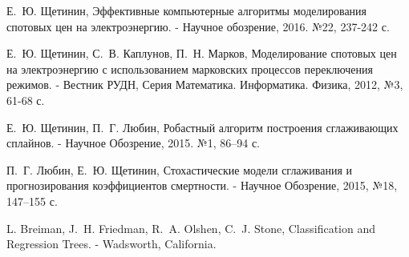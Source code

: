 \documentclass[60x84/16,8pt]{ittmm}
\begin{document}
\begin{thebibliography}{99}

Е.~Ю. Щетинин, Эффективные компьютерные алгоритмы моделирования спотовых цен на
электроэнергию. - Научное обозрение, 2016. №22, 237-242 с.

Е.~Ю. Щетинин, С.~В. Каплунов, П.~Н. Марков, Моделирование спотовых цен на
электроэнергию с использованием марковских процессов переключения режимов. -
Вестник РУДН, Серия Математика. Информатика. Физика, 2012, №3, 61-68 с.

Е.~Ю. Щетинин, П.~Г. Любин, Робастный алгоритм построения сглаживающих сплайнов.
- Научное Обозрение, 2015. №1, 86–94 с.

П.~Г. Любин, Е.~Ю. Щетинин, Стохастические модели сглаживания и прогнозирования
коэффициентов смертности. - Научное Обозрение, 2015, №18, 147–155 с.

L. Breiman, J.~H. Friedman, R.~A. Olshen, C.~J. Stone, Classification and
Regression Trees. - Wadsworth, California.

\end{thebibliography}


% 
% 


\makealttitle      
\end{document}
